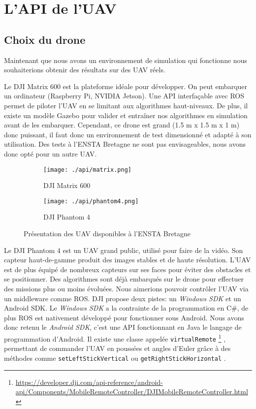\section{L'API de l'UAV}
\subsection{Choix du drone}

Maintenant que nous avons un environnement de simulation qui fonctionne nous souhaiterions 
obtenir des résultats sur des UAV réels. 

Le DJI Matrix 600 est la plateforme idéale pour développer. On peut embarquer un
ordinateur (Raspberry Pi, NVIDIA Jetson). Une API interfaçable avec ROS permet de
piloter l’UAV en se limitant aux algorithmes haut-niveaux. De plus, il existe un modèle
Gazebo pour valider et entraîner nos algorithmes en simulation avant de les embarquer.
Cependant, ce drone est grand (1.5 m x 1.5 m x 1 m) donc puissant, il faut donc un
environnement de test dimensionné et adapté à son utilisation. Des tests à l’ENSTA
Bretagne ne sont pas envisageables, nous avons donc opté pour un autre UAV. 

\begin{figure}[!htb]
    \centering
    \begin{subfigure}[b]{0.4\textwidth}
        \centering
        \texttt{[image: ./api/matrix.png]}
        \caption{DJI Matrix 600}
        \label{fig:marker}
    \end{subfigure}
    \hfill
    \begin{subfigure}[b]{0.4\textwidth}
        \centering
        \texttt{[image: ./api/phantom4.png]}
        \caption{DJI Phantom 4}
        \label{fig:manifold}
    \end{subfigure}
    \caption{Présentation des UAV disponibles à l'ENSTA Bretagne}
    \label{fig:environnement}
\end{figure}

Le DJI Phantom 4 est un UAV grand public, utilisé pour faire de la vidéo. Son capteur
haut-de-gamme produit des images stables et de haute résolution. L’UAV est de plus
équipé de nombreux capteurs sur ses faces pour éviter des obstacles et se positionner.
Des algorithmes sont déjà embarqués sur le drone pour effectuer des missions plus ou
moins évoluées. Nous aimerions pouvoir contrôler l’UAV via un middleware comme
ROS. DJI propose deux pistes: un \textit{Windows SDK} et un Android SDK. Le \textit{Windows SDK}
a la contrainte de la programmation en C\#, de plus ROS est nativement développé pour
fonctionner sous Android. Nous avons donc retenu le \textit{Android SDK}, c’est une API
fonctionnant en Java le langage de programmation d’Android. Il existe une classe
appelée \texttt{virtualRemote} \footnote{\url{https://developer.dji.com/api-reference/android-api/Components/MobileRemoteController/DJIMobileRemoteController.html}} , permettant de commander l’UAV en poussées et angles
d’Euler grâce à des méthodes comme \texttt{setLeftStickVertical} ou \texttt{getRightStickHorizontal}  .

